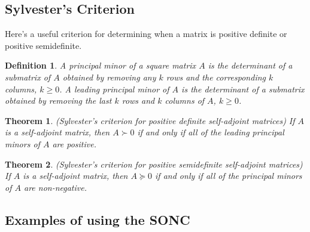 \documentclass[11pt]{book}
\newtheorem{definition}{Definition}[subsection]
\newtheorem{theorem}{Theorem}[subsection]
\begin{document}
\subsection{Sylvester's Criterion}
Here's a useful criterion for determining when a matrix is positive definite or positive semidefinite.
\begin{definition}
A principal minor of a square matrix $A$ is the determinant of a submatrix of $A$ obtained by removing any $k$ rows and the corresponding $k$ columns, $k \geq 0$. A leading principal minor of $A$ is the determinant of a submatrix obtained by removing the last $k$ rows and $k$ columns of $A$, $k \geq 0$.
\end{definition}

\begin{theorem}
(Sylvester's criterion for positive definite self-adjoint matrices) If $A$ is a self-adjoint matrix, then $A \succ 0$ if and only if all of the leading principal minors of $A$ are positive.
\end{theorem}
\begin{theorem}
(Sylvester's criterion for positive semidefinite self-adjoint matrices) If $A$ is a self-adjoint matrix, then $A \succeq 0$ if and only if all of the principal minors of $A$ are non-negative.
\end{theorem}

\subsection{Examples of using the SONC}
\end{document}
